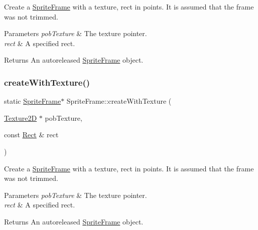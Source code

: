 Create a \hyperlink{classSpriteFrame}{Sprite\+Frame} with a texture, rect in points. It is assumed that the frame was not trimmed. 
\begin{DoxyParams}{Parameters}
{\em pob\+Texture} & The texture pointer. \\
\hline
{\em rect} & A specified rect. \\
\hline
\end{DoxyParams}
\begin{DoxyReturn}{Returns}
An autoreleased \hyperlink{classSpriteFrame}{Sprite\+Frame} object. 
\end{DoxyReturn}
\mbox{\label{classSpriteFrame_ab8d6e985de43f7b2cb496cce3f3ba627}} 
\subsubsection{\texorpdfstring{create\+With\+Texture()}{createWithTexture()}\hspace{0.1cm}{\footnotesize\ttfamily [2/4]}}
{\footnotesize\ttfamily static \hyperlink{classSpriteFrame}{Sprite\+Frame}$\ast$ Sprite\+Frame\+::create\+With\+Texture (\begin{DoxyParamCaption}\item[{\hyperlink{classTexture2D}{Texture2D} $\ast$}]{pob\+Texture,  }\item[{const \hyperlink{classRect}{Rect} \&}]{rect }\end{DoxyParamCaption})\hspace{0.3cm}{\ttfamily [static]}}

Create a \hyperlink{classSpriteFrame}{Sprite\+Frame} with a texture, rect in points. It is assumed that the frame was not trimmed. 
\begin{DoxyParams}{Parameters}
{\em pob\+Texture} & The texture pointer. \\
\hline
{\em rect} & A specified rect. \\
\hline
\end{DoxyParams}
\begin{DoxyReturn}{Returns}
An autoreleased \hyperlink{classSpriteFrame}{Sprite\+Frame} object. 
\end{DoxyReturn}
\mbox{\label{classSpriteFrame_a0f689fde96ad43b838ed4a8ac6759f7a}} 
